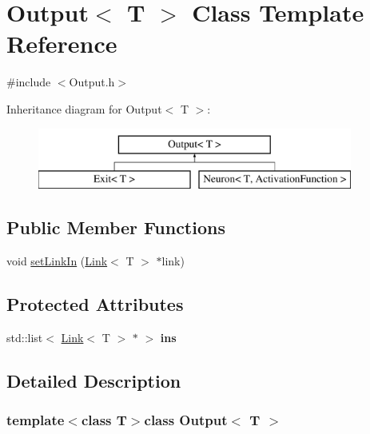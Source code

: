 \hypertarget{class_output}{\section{\-Output$<$ \-T $>$ \-Class \-Template \-Reference}
\label{class_output}
}


{\ttfamily \#include $<$\-Output.\-h$>$}

\-Inheritance diagram for \-Output$<$ \-T $>$\-:\begin{figure}[H]
\begin{center}
\leavevmode
\includegraphics[height=2.000000cm]{class_output}
\end{center}
\end{figure}
\subsection*{\-Public \-Member \-Functions}
\begin{DoxyCompactItemize}
\item 
void \hyperlink{class_output_afd26f81d178846371c17d63015f2eb9f}{set\-Link\-In} (\hyperlink{class_link}{\-Link}$<$ \-T $>$ $\ast$link)
\end{DoxyCompactItemize}
\subsection*{\-Protected \-Attributes}
\begin{DoxyCompactItemize}
\item 
\hypertarget{class_output_ade68e41659b12f8a7e31f8dc8507bb50}{std\-::list$<$ \hyperlink{class_link}{\-Link}$<$ \-T $>$ $\ast$ $>$ {\bfseries ins}}\label{class_output_ade68e41659b12f8a7e31f8dc8507bb50}

\end{DoxyCompactItemize}


\subsection{\-Detailed \-Description}
\subsubsection*{template$<$class \-T$>$class Output$<$ T $>$}

